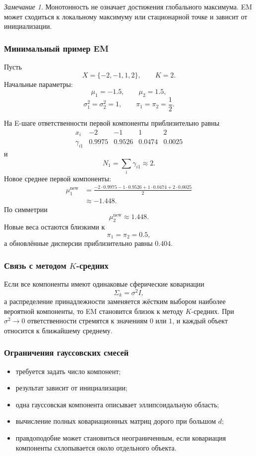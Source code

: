 \documentclass[12pt,a4paper]{article}
\theoremstyle{definition}
\theoremstyle{remark}
\newtheorem{remark}[theorem]{Замечание}
\begin{document}
\begin{remark}
Монотонность не означает достижения глобального максимума. EM может
сходиться к локальному максимуму или стационарной точке и зависит от
инициализации.
\end{remark}

\subsubsection{Минимальный пример EM}

Пусть
\[
    X=\{-2,-1,1,2\},
    \qquad K=2.
\]
Начальные параметры:
\[
    \mu_1=-1.5,\qquad
    \mu_2=1.5,
\]
\[
    \sigma_1^2=\sigma_2^2=1,
    \qquad
    \pi_1=\pi_2=\frac12.
\]

На E-шаге ответственности первой компоненты приблизительно равны
\[
\begin{array}{c|cccc}
x_i&-2&-1&1&2\\
\hline
\gamma_{i1}
&0.9975&0.9526&0.0474&0.0025
\end{array}
\]
и
\[
    N_1
    =
    \sum_i\gamma_{i1}
    \approx 2.
\]
Новое среднее первой компоненты:
\[
\begin{split}
    \mu_1^{\mathrm{new}}
    &=
    \frac{
        -2\cdot0.9975
        -1\cdot0.9526
        +1\cdot0.0474
        +2\cdot0.0025
    }{2}\\
    &\approx -1.448.
\end{split}
\]
По симметрии
\[
    \mu_2^{\mathrm{new}}\approx 1.448.
\]
Новые веса остаются близкими к
\[
    \pi_1=\pi_2=0.5,
\]
а обновлённые дисперсии приблизительно равны $0.404$.

\subsubsection{Связь с методом $K$-средних}

Если все компоненты имеют одинаковые сферические ковариации
\[
    \Sigma_k=\sigma^2I,
\]
а распределение принадлежности заменяется жёстким выбором наиболее
вероятной компоненты, то EM становится близок к методу $K$-средних.
При $\sigma^2\to 0$ ответственности стремятся к значениям $0$ или $1$,
и каждый объект относится к ближайшему среднему.

\subsubsection{Ограничения гауссовских смесей}

\begin{itemize}
    \item требуется задать число компонент;
    \item результат зависит от инициализации;
    \item одна гауссовская компонента описывает эллипсоидальную область;
    \item вычисление полных ковариационных матриц дорого при большом $d$;
    \item правдоподобие может становиться неограниченным, если ковариация
          компоненты схлопывается около отдельного объекта.
\end{itemize}
\end{document}
